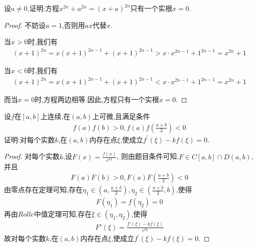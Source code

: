\documentclass[lang=cn,newtx,10pt,scheme=chinese]{../Template/elegantbook}
\begin{document}
\begin{exercise}
设\(a\neq0\),证明:方程\(x^{2n}+a^{2n}=(x + a)^{2n}\)只有一个实根\(x = 0\).
\end{exercise}    
\begin{proof}
        不妨设$a=1$,否则用$ax$代替$x$.

        当$x>0$时,我们有
        \begin{gather}
            (x+1)^{2n}=x(x+1)^{2n-1}+(x+1)^{2n-1}>x\cdot x^{2n-1}+1^{2n-1}=x^{2n}+1
            \nonumber
        \end{gather}

        当$x<0$时,我们有
        \begin{gather}
            (x+1)^{2n}=x(x+1)^{2n-1}+(x+1)^{2n-1}<x\cdot x^{2n-1}+1^{2n-1}=x^{2n}+1
            \nonumber
        \end{gather}

        而当$x=0$时,方程两边相等.因此,方程只有一个实根$x=0$.
\end{proof}


\begin{exercise}
    设\(f\)在\([a,b]\)上连续,在\((a,b)\)上可微,且满足条件
    \begin{gather}
        f(a)f(b)>0,f(a)f\left(\frac{a + b}{2}\right)<0
        \nonumber
    \end{gather}
    证明:对每个实数\(k\),在\((a,b)\)内存在点\(\xi\),使成立\(f^{\prime}(\xi)-kf(\xi)=0\).
\end{exercise}
\begin{proof}
        对每个实数$k$,设$F\left( x \right) =\frac{f\left( x \right)}{e^{kx}}$,
        则由题目条件可知,$F\in C\left[ a,b \right] \cap D\left( a,b \right)$,并且
        \begin{gather}
            F\left( a \right) F\left( b \right) >0,F\left( a \right) F\left( \frac{a+b}{2} \right) <0
            \nonumber
        \end{gather}
        由零点存在定理可知,存在$\eta_1\in(a,\frac{a+b}{2}),\eta_2\in(\frac{a+b}{2},b)$,使得
        \begin{gather}
            F(\eta_1)=f(\eta_2)=0
            \nonumber
        \end{gather}
        再由$Rolle$中值定理可知,存在$\xi\in(\eta_1,\eta_2)$,使得
        \begin{gather}
            F'\left( \xi \right) =\frac{f'\left( \xi \right) -kf\left( \xi \right)}{e^{k\xi}}
            \nonumber
        \end{gather}
        故对每个实数\(k\),在\((a,b)\)内存在点\(\xi\),使成立\(f^{\prime}(\xi)-kf(\xi)=0\).
\end{proof}
\end{document}
